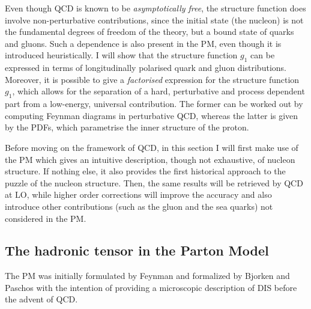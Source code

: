 Even though QCD is known to be \textit{asymptotically free}, the structure function does involve non-perturbative contributions, since the initial state (the nucleon) is not the fundamental degrees of freedom of the theory, but a bound state of quarks and gluons. Such a dependence is also present in the PM, even though it is introduced heuristically. I will show that the structure function $g_1$ can be expressed in terms of longitudinally polarised quark and gluon distributions. Moreover, it is possible to give a \textit{factorised} expression for the structure function $g_1$, which allows for the separation of a hard, perturbative and process dependent part from a low-energy, universal contribution. The former can be worked out by computing Feynman diagrams in perturbative QCD, whereas the latter is given by the PDFs, which parametrise the inner structure of the proton.%

Before moving on the framework of QCD, in this section I will first make use of the PM which gives an intuitive description, though not exhaustive, of nucleon structure. If nothing else, it also provides the first historical approach to the puzzle of the nucleon structure. Then, the same results will be retrieved by QCD at LO, while higher order corrections will improve the accuracy and also introduce other contributions (such as the gluon and the sea quarks) not considered in the PM.


\subsection{The hadronic tensor in the Parton Model}
\label{subsec:PM_hadronic_tensor}
The PM was initially formulated by Feynman \cite{PhysRevLett.23.1415} and formalized by Bjorken and Paschos \cite{PhysRev.185.1975} with the intention of providing a microscopic description of DIS before the advent of QCD.%

